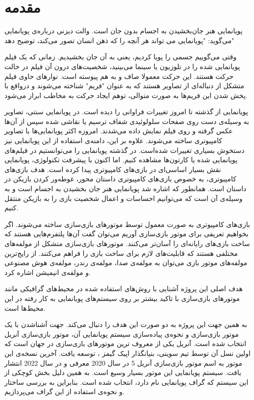 \chapter{مقدمه}






پویانمایی هنر جان‌بخشیدن به اجسام بدون جان است.
والت دیزنی درباره‌‌ی پویانمایی می‌گوید: "پویانمایی می تواند هر آنچه را که ذهن انسان تصور می‌کند، توضیح دهد"

وقتی می‌گوییم جسمی را پویا کردیم، یعنی به آن جان بخشیدیم.
زمانی که یک فیلم پویانمایی شده را در تلوزیون یا سینما می‌بینید، شخصیت‌های درون آن فیلم در حالت حرکت هستند.
این حرکت معمولا صاف و به هم پیوسته است. نوارهای حاوی فیلم متشکل از دنباله‌ای از تصاویر هستند که به عنوان "فریم" شناخته می‌شوند و درواقع با پخش شدن این فریم‌ها
به صورت متوالی، توهم ایجاد حرکت به مخاطب ابراز می‌شود.

پویانمایی از گذشته تا امروز تغییرات فراوانی را دیده است.
در پویانمایی سنتی، تصاویر به وسیله‌‌ی دست روی صفحات سلولوئیدی شفاف ترسیم یا نقاشی شده 
سپس از آن‌ها عکس گرفته و روی فیلم نمایش داده می‌شدند.
امروزه اکثر پویانمایی‌ها با تصاویر کامپیوتری
ساخته می‌شوند.
\cite{AnimationWikipedia}
علاوه بر این، دامنه‌ی استفاده از این پویانمایی نیز دستخوش بسیاری تغییرات شده‌است.
در گذشته پویانمایی را می‌توانستیم در فیلم‌های پویانمایی شده یا کارتون‌ها مشاهده کنیم.
اما اکنون با پیشرفت تکنولوژی، پویانمایی نقش بسیار اساسی‌ای در بازی‌های کامپیوتری پیدا کرده است.
هدف بازی‌‌های کامپیوتری، به خصوص بازی‌های کامپیوتری داستان محور، غوطه‌ور کردن بازیکن 
در داستان است.
همانطور که اشاره شد پویانمایی هنر جان بخشیدن به اجسام است و به وسیله‌ی 
آن است که می‌توانیم احساسات و اعمال شخصیت بازی را به بازیکن منتقل کنیم.

بازی‌های کامپیوتری به صورت معمول توسط موتور‌های بازی‌سازی ساخته می‌شوند.
اگر بخواهیم تعریفی برای موتور بازی‌سازی آوریم می‌توان گفت 
آن‌ها پلتفرم‌هایی هستند که ساخت بازی‌های رایانه‌ای را آسان‌تر می‌کنند.
موتور‌های بازی‌سازی متشکل از مولفه‌های مختلفی هستند که قابلیت‌های لازم برای ساخت بازی را فراهم می‌کنند.
از رایج‌ترین مولفه‌های موتور بازی می‌توان به مولفه‌ی صدا، مولفه‌ی رندر، مولفه‌ی هوش مصنوعی و مولفه‌ی انیمیشن اشاره کرد.
\cite{barczak2019comparative}

هدف اصلی این پروژه آشنایی با روش‌های استفاده شده در محیط‌های گرافیکی مانند موتورهای بازی‌سازی با تاکید بیشتر بر 
روی سیستم‌های پویانمایی به کار رفته در این محیط‌ها است.

به همین جهت این پروژه به دو صورت این هدف را دنبال می‌کند.
جهت آشناشدن با یک موتور بازی‌سازی و نحوه‌ی پیاده‌سازی سیستم پویانمایی آن، موتور 
بازی‌سازی آنریل انتخاب شده است.
آنریل یکی از معروف ترین موتور‌های بازی‌سازی در جهان است که اولین نسل آن
توسط تیم سوینی، بنیانگذار اپیک گیمز 
، توسعه یافت.
آخرین نسخه‌ی این موتور به اسم موتور بازی‌سازی آنریل 5 
در سال 2020 معرفی و در سال 2022 انتشار یافت.
سیستم پویانمایی این موتور بسیار وسیع است. به همین دلیل بخش کوچکی از این سیستم که گراف پویانمایی نام دارد، انتخاب شده است.
بنابراین به بررسی ساختار و نحوه‌ی استفاده از این گراف می‌پردازیم.

